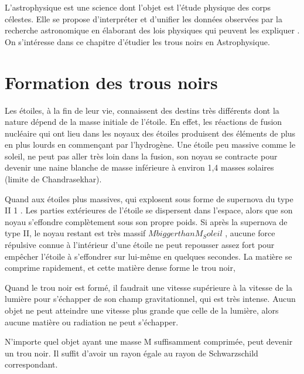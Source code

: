 L’astrophysique est une science dont l’objet est l’étude physique des corps célestes. Elle
se propose d’interpréter et d’unifier les données observées par la recherche astronomique
en élaborant des lois physiques qui peuvent les expliquer \cite{2}. On s’intéresse dans ce
chapitre d’étudier les trous noirs en Astrophysique.
	\section{Formation des trous noirs}
	
	Les étoiles, à la fin de leur vie, connaissent des destins très différents dont la nature
dépend de la masse initiale de l’étoile. En effet, les réactions de fusion nucléaire qui ont lieu
dans les noyaux des étoiles produisent des éléments de plus en plus lourds en commençant
par l’hydrogène.
Une étoile peu massive comme le soleil, ne peut pas aller très loin dans la fusion,
son noyau se contracte pour devenir une naine blanche de masse inférieure à environ 1,4
masses solaires (limite de Chandrasekhar).


Quand aux étoiles plus massives, qui explosent sous forme de supernova du type II 1 .
Les parties extérieures de l’étoile se dispersent dans l’espace, alors que son noyau s’effondre
complètement sous son propre poids. Si après la supernova de type II, le noyau restant
est très massif $M bigger than M_Soleil$ , aucune force répulsive connue à l’intérieur d’une étoile ne
peut repousser assez fort pour empêcher l’étoile à s’effondrer sur lui-même en quelques
secondes. La matière se comprime rapidement, et cette matière dense forme le trou noir,

Quand le trou noir est formé, il faudrait une vitesse supérieure à la vitesse de la lumière
pour s’échapper de son champ gravitationnel, qui est très intense. Aucun objet ne peut
atteindre une vitesse plus grande que celle de la lumière, alors aucune matière ou radiation
ne peut s’échapper.

N’importe quel objet ayant une masse M suffisamment comprimée, peut devenir un
trou noir. Il suffit d’avoir un rayon égale au rayon de Schwarzschild correspondant.

	
	
	
	
	
	
	
	

